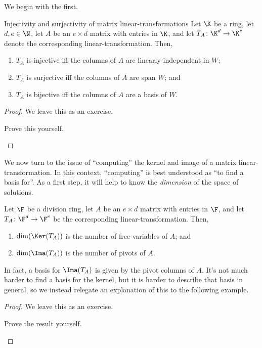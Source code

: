 We begin with the first.
\begin{prp}{Injectivity and surjectivity of matrix linear-transformations}{}
	Let $\K$ be a ring, let $d,e\in \N$, let $A$ be an $e\times d$ matrix with entries in $\K$, and let $T_A\colon \K ^d\rightarrow \K ^e$ denote the corresponding linear-transformation.  Then,
	\begin{enumerate}
		\item $T_A$ is injective iff the columns of $A$ are linearly-independent in $W$;
		\item $T_A$ is surjective iff the columns of $A$ are span $W$; and
		\item $T_A$ is bijective iff the columns of $A$ are a basis of $W$.
	\end{enumerate}
	\begin{proof}
		We leave this as an exercise.
		\begin{exr}[breakable=false]{}{}
			Prove this yourself.
		\end{exr}
	\end{proof}
\end{prp}
We now turn to the issue of ``computing'' the kernel and image of a matrix linear-transformation.  In this context, ``computing'' is best understood as ``to find a basis for''.  As a first step, it will help to know the \emph{dimension} of the space of solutions.
\begin{prp}{}{}
	Let $\F$ be a division ring, let $A$ be an $e\times d$ matrix with entries in $\F$, and let $T_A\colon \F ^d\rightarrow \F ^e$ be the corresponding linear-transformation.  Then,
	\begin{enumerate}
		\item $\dim (\Ker (T_A))$ is the number of free-variables of $A$; and
		\item $\dim (\Ima (T_A))$ is the number of pivots of $A$.
	\end{enumerate}
	\begin{rmk}
		In fact, a basis for $\Ima (T_A)$ is given by the pivot columns of $A$.  It's not much harder to find a basis for the kernel, but it is harder to describe that basis in general, so we instead relegate an explanation of this to the following example.
	\end{rmk}
	\begin{proof}
		We leave this as an exercise.
		\begin{exr}[breakable=false]{}{}
			Prove the result yourself.
		\end{exr}
	\end{proof}
\end{prp}
